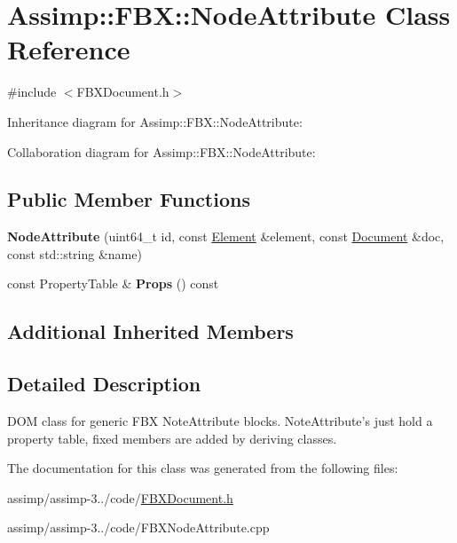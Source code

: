 \hypertarget{class_assimp_1_1_f_b_x_1_1_node_attribute}{\section{Assimp\+:\+:F\+B\+X\+:\+:Node\+Attribute Class Reference}
\label{class_assimp_1_1_f_b_x_1_1_node_attribute}
}


{\ttfamily \#include $<$F\+B\+X\+Document.\+h$>$}



Inheritance diagram for Assimp\+:\+:F\+B\+X\+:\+:Node\+Attribute\+:


Collaboration diagram for Assimp\+:\+:F\+B\+X\+:\+:Node\+Attribute\+:
\subsection*{Public Member Functions}
\begin{DoxyCompactItemize}
\item 
\hypertarget{class_assimp_1_1_f_b_x_1_1_node_attribute_a7f051136b67353d0c7af569ed4a66ab7}{{\bfseries Node\+Attribute} (uint64\+\_\+t id, const \hyperlink{class_assimp_1_1_f_b_x_1_1_element}{Element} \&element, const \hyperlink{class_assimp_1_1_f_b_x_1_1_document}{Document} \&doc, const std\+::string \&name)}\label{class_assimp_1_1_f_b_x_1_1_node_attribute_a7f051136b67353d0c7af569ed4a66ab7}

\item 
\hypertarget{class_assimp_1_1_f_b_x_1_1_node_attribute_a00160573f5919b2dfb0947f0ffee08be}{const Property\+Table \& {\bfseries Props} () const }\label{class_assimp_1_1_f_b_x_1_1_node_attribute_a00160573f5919b2dfb0947f0ffee08be}

\end{DoxyCompactItemize}
\subsection*{Additional Inherited Members}


\subsection{Detailed Description}
D\+O\+M class for generic F\+B\+X Note\+Attribute blocks. Note\+Attribute's just hold a property table, fixed members are added by deriving classes. 

The documentation for this class was generated from the following files\+:\begin{DoxyCompactItemize}
\item 
assimp/assimp-\/3../code/\hyperlink{_f_b_x_document_8h}{F\+B\+X\+Document.\+h}\item 
assimp/assimp-\/3../code/F\+B\+X\+Node\+Attribute.\+cpp\end{DoxyCompactItemize}
